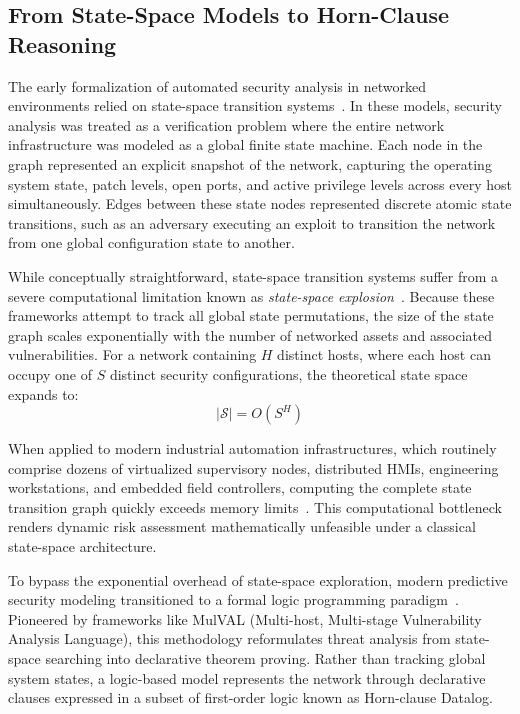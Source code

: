 \documentclass[target=mst,aauheader=aics,style=]{thud}
\begin{document}
\subsection{From State-Space Models to Horn-Clause Reasoning}
\label{sec:state_space_to_horn}
The early formalization of automated security analysis in networked environments relied on state-space transition systems~\cite{KonstaSurvey, WachterSurvey}. In these models, security analysis was treated as a verification problem where the entire network infrastructure was modeled as a global finite state machine. Each node in the graph represented an explicit snapshot of the network, capturing the operating system state, patch levels, open ports, and active privilege levels across every host simultaneously. Edges between these state nodes represented discrete atomic state transitions, such as an adversary executing an exploit to transition the network from one global configuration state to another.

While conceptually straightforward, state-space transition systems suffer from a severe computational limitation known as \textit{state-space explosion}~\cite{Ou05, WachterSurvey}. Because these frameworks attempt to track all global state permutations, the size of the state graph scales exponentially with the number of networked assets and associated vulnerabilities. For a network containing $H$ distinct hosts, where each host can occupy one of $S$ distinct security configurations, the theoretical state space expands to:
\begin{equation}
|\mathcal{S}| = O(S^H)
\end{equation}

When applied to modern industrial automation infrastructures, which routinely comprise dozens of virtualized supervisory nodes, distributed HMIs, engineering workstations, and embedded field controllers, computing the complete state transition graph quickly exceeds memory limits~\cite{KonstaSurvey, WachterSurvey}. This computational bottleneck renders dynamic risk assessment mathematically unfeasible under a classical state-space architecture.

To bypass the exponential overhead of state-space exploration, modern predictive security modeling transitioned to a formal logic programming paradigm~\cite{Ou05, WachterSurvey}. Pioneered by frameworks like MulVAL (Multi-host, Multi-stage Vulnerability Analysis Language), this methodology reformulates threat analysis from state-space searching into declarative theorem proving. Rather than tracking global system states, a logic-based model represents the network through declarative clauses expressed in a subset of first-order logic known as Horn-clause Datalog.
\end{document}
